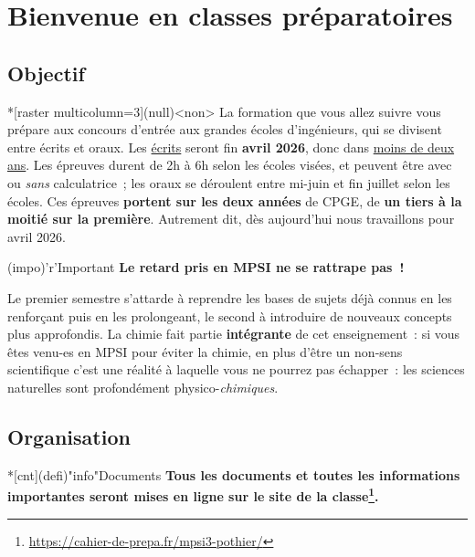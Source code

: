 \documentclass[a4paper, 10pt, garamond]{book}
\begin{document}
\setcounter{chapter}{-1}

\chapter{Bienvenue en classes pr\'eparatoires}

\section{Objectif}

\noindent
\begin{tcbraster}[raster columns=4, raster equal height=rows]
	\begin{tcn}*[raster multicolumn=3](null)<non>{}
		La formation que vous allez suivre vous prépare aux concours d'entrée aux
		grandes écoles d'ingénieurs, qui se divisent entre écrits et oraux. Les
		\underline{écrits} seront fin \textbf{avril 2026}, donc dans
		\underline{moins de deux ans}. Les épreuves durent de 2h à 6h selon les
		écoles visées, et peuvent être avec ou \textit{sans} calculatrice~; les
		oraux se déroulent entre mi-juin et fin juillet selon les écoles. Ces
		épreuves \textbf{portent sur les deux années} de CPGE, de \textbf{un tiers à
			la moitié sur la première}. Autrement dit, dès aujourd'hui nous travaillons
		pour avril 2026.
	\end{tcn}
	\begin{tcn}[width=.5\linewidth, cnt](impo)'r'{Important}
		\textbf{Le retard pris en MPSI ne se rattrape pas~!}
	\end{tcn}
\end{tcbraster}

Le premier semestre s'attarde à reprendre les bases de sujets déjà connus en les
renforçant puis en les prolongeant, le second à introduire de nouveaux concepts
plus approfondis. La chimie fait partie \textbf{intégrante} de cet
enseignement~: si vous êtes venu-es en MPSI pour éviter la chimie, en plus
d'être un non-sens scientifique c'est une réalité à laquelle vous ne pourrez pas
échapper~: les sciences naturelles sont profondément physico-\textit{chimiques}.

\section{Organisation}
\begin{tcn}*[cnt](defi)"info"{Documents}
	\bfseries
	Tous les documents et toutes les informations importantes seront mises en
	ligne sur le site de la
	classe\footnote{\url{https://cahier-de-prepa.fr/mpsi3-pothier/}}.
\end{tcn}
\end{document}
